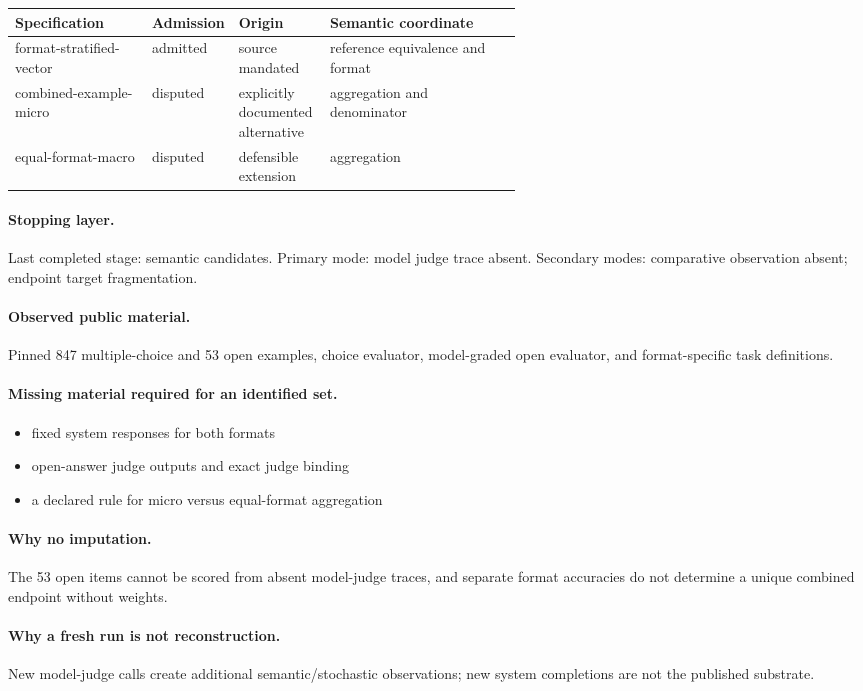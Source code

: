 \begingroup
\scriptsize
\begin{tabularx}{\linewidth}{@{}p{0.27\linewidth}p{0.14\linewidth}p{0.18\linewidth}X@{}}
\toprule
Specification & Admission & Origin & Semantic coordinate \\
\midrule
format-stratified-vector & admitted & source mandated & reference equivalence and format \\
combined-example-micro & disputed & explicitly documented alternative & aggregation and denominator \\
equal-format-macro & disputed & defensible extension & aggregation \\
\bottomrule
\end{tabularx}
\endgroup

\paragraph{Stopping layer.} Last completed stage: semantic candidates. Primary mode: model judge trace absent. Secondary modes: comparative observation absent; endpoint target fragmentation.

\paragraph{Observed public material.} Pinned 847 multiple-choice and 53 open examples, choice evaluator, model-graded open evaluator, and format-specific task definitions.

\paragraph{Missing material required for an identified set.}
\begin{itemize}
  \item fixed system responses for both formats
  \item open-answer judge outputs and exact judge binding
  \item a declared rule for micro versus equal-format aggregation
\end{itemize}

\paragraph{Why no imputation.} The 53 open items cannot be scored from absent model-judge traces, and separate format accuracies do not determine a unique combined endpoint without weights.

\paragraph{Why a fresh run is not reconstruction.} New model-judge calls create additional semantic/stochastic observations; new system completions are not the published substrate.

